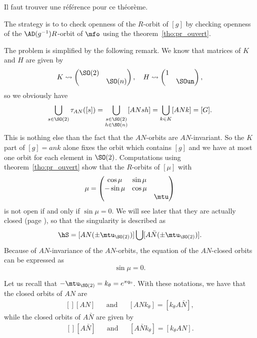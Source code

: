 \begin{probleme}
Il faut trouver une référence pour ce théorème.
\end{probleme}

The strategy is to to check openness of the $R$-orbit of $[g]$ by checking openness of the $\AD(g^{-1})R$-orbit of $\mfo$ using the theorem~\ref{tho:pr_ouvert}.

The problem is simplified by the following remark.  We know that matrices of $K$ and $H$ are given by
\begin{equation}	\label{eq:K_H_SO}
  K\leadsto \begin{pmatrix}
                \SO(2)&   \\
		      & \SO(n)
            \end{pmatrix},\quad
  H\leadsto \begin{pmatrix}
                    1 & \\
		     & \SOun
            \end{pmatrix},
\end{equation}
so we obviously have
\[
\bigcup_{s\in \SO(2)} \tau_{AN}([s]) =\bigcup_{\substack { s\in \SO(2)\\ h\in \SO(n)}}[ANsh] =\bigcup_{k\in K} [ANk] =[G].
\]
This is nothing else than the fact that the $AN$-orbits are $AN$-invariant.
So the $K$ part of $[g]=ank$ alone fixes the orbit which contains $[g]$ and we have at most one orbit for each element in $\SO(2)$. Computations using theorem~\ref{tho:pr_ouvert} show that the $R$-orbits of $[\mu]$ with
\[
\mu=
\begin{pmatrix}
\cos\mu &\sin\mu\\
-\sin\mu&\cos\mu\\
&&\mtu
\end{pmatrix}
\]
is not open if and only if $\sin \mu=0$. We will see later that they are actually closed (page \pageref{PgTopoOrb}), so that the singularity is described as
\begin{equation}\label{Sing2}
\hS=[AN(\pm\mtu_{\SO(2)})]\bigcup[A \bar{N}(\pm\mtu_{\SO(2)})].
\end{equation}
 Because of $AN$-invariance of the $AN$-orbits, the equation of the $AN$-closed orbits can be expressed as
\begin{equation}
\sin \mu=0.
\end{equation}

Let us recall that $-\mtu_{\SO(2)}=k_{\theta}= e^{\pi q_0}$. With these notations, we have that the closed orbits of $AN$ are
\begin{equation}
	\begin{aligned}[]
		[AN]&&\text{and}&&[ANk_{\theta}]=[k_{\theta}A\bar N],
	\end{aligned}
\end{equation}
while the closed orbits of $A\bar N$ are given by
\begin{equation}
	\begin{aligned}[]
		[A\bar N]&&\text{and}&&[A\bar Nk_{\theta}]=[k_{\theta}AN].
	\end{aligned}
\end{equation}

